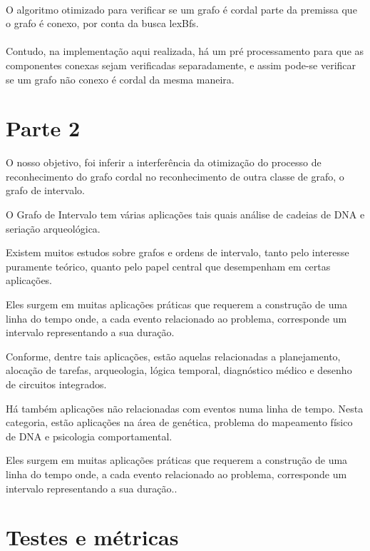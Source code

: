 \documentclass[a4paper, 11pt]{article}
\begin{document}
						\paragraph{}O algoritmo otimizado para verificar se um grafo é cordal parte da premissa que o grafo é conexo, por conta da busca lexBfs.
						
						\paragraph{}Contudo, na implementação aqui realizada, há um pré processamento para que as componentes conexas sejam verificadas separadamente, e assim pode-se verificar se um grafo não conexo é cordal da mesma maneira.
						
						
			
		\section{Parte 2}
			O nosso objetivo, foi inferir a interferência da otimização do processo de reconhecimento do grafo cordal no reconhecimento de outra classe de grafo, o grafo de intervalo.
						
			O Grafo de Intervalo tem várias aplicações tais quais análise de cadeias de DNA e seriação arqueológica.
			
			Existem  muitos  estudos  sobre  grafos  e  ordens  de  intervalo,   tanto  pelo  interesse  puramente  teórico,  quanto  pelo  papel  central  que  desempenham  em  certas aplicações.
			
			 Eles surgem em muitas aplicações práticas que requerem a construção de uma linha do tempo onde, a cada evento relacionado ao problema, corresponde um intervalo representando a sua duração.
			 
			 Conforme, dentre tais aplicações, estão aquelas relacionadas a planejamento,  alocação de tarefas,  arqueologia,  lógica temporal,  diagnóstico médico  e desenho de circuitos integrados.
			 
			 Há também aplicações não relacionadas com eventos numa linha de tempo. Nesta categoria, estão aplicações na área de genética, problema do mapeamento físico de DNA e psicologia comportamental.
			\par Eles surgem em muitas aplicações práticas que requerem a construção de uma linha do tempo onde, a cada evento relacionado ao problema, corresponde um intervalo representando a sua duração..
		\section{Testes e métricas}	
\end{document}
